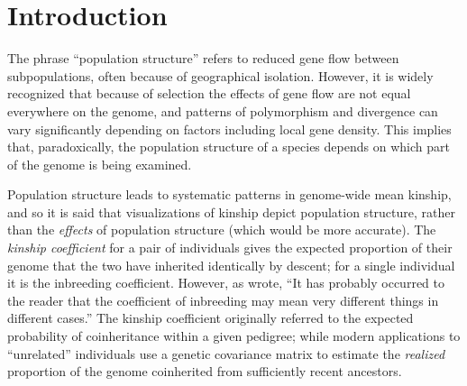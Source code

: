 \documentclass[11pt, oneside]{article}   	%
\begin{document}
\section{Introduction}



The phrase ``population structure'' refers to reduced gene flow between subpopulations, 
often because of geographical isolation.
However, it is widely recognized that because of selection the effects of gene flow are not equal everywhere on the genome,
and patterns of polymorphism and divergence can vary significantly depending on factors including local gene density.
This implies that, paradoxically, 
the population structure of a species depends on which part of the genome is being examined.

Population structure leads to systematic patterns in genome-wide mean kinship,
and so it is said that visualizations of kinship depict population structure,
rather than the \emph{effects} of population structure (which would be more accurate).
The \emph{kinship coefficient} for a pair of individuals
gives the expected proportion of their genome
that the two have inherited identically by descent;
for a single individual it is the inbreeding coefficient.
However, as \citet{wright1949genetical} wrote,
``It has probably occurred to the reader that the coefficient of inbreeding
may mean very different things in different cases.''
The kinship coefficient originally referred to the expected probability
of coinheritance within a given pedigree;
while modern applications to ``unrelated'' individuals
use a genetic covariance matrix to estimate the \emph{realized} proportion of the genome
coinherited from sufficiently recent ancestors.
\end{document}
